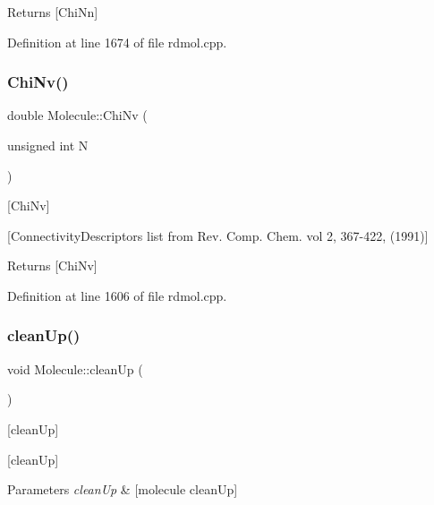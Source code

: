 \begin{DoxyReturn}{Returns}
\mbox{[}Chi\+Nn\mbox{]} 
\end{DoxyReturn}


Definition at line 1674 of file rdmol.\+cpp.

\mbox{\label{class_molecule_ada6fd7f4b47622e5a07d80052cf0d0b5}} 
\subsubsection{\texorpdfstring{Chi\+Nv()}{ChiNv()}}
{\footnotesize\ttfamily double Molecule\+::\+Chi\+Nv (\begin{DoxyParamCaption}\item[{unsigned int}]{N }\end{DoxyParamCaption})}



\mbox{[}Chi\+Nv\mbox{]} 

\mbox{[}Connectivity\+Descriptors list from Rev. Comp. Chem. vol 2, 367-\/422, (1991)\mbox{]}

\begin{DoxyReturn}{Returns}
\mbox{[}Chi\+Nv\mbox{]} 
\end{DoxyReturn}


Definition at line 1606 of file rdmol.\+cpp.

\mbox{\label{class_molecule_ae9aeca03c03bbd36ab63c4a69e2ddc82}} 
\subsubsection{\texorpdfstring{clean\+Up()}{cleanUp()}}
{\footnotesize\ttfamily void Molecule\+::clean\+Up (\begin{DoxyParamCaption}{ }\end{DoxyParamCaption})}



\mbox{[}clean\+Up\mbox{]} 

\mbox{[}clean\+Up\mbox{]}


\begin{DoxyParams}{Parameters}
{\em clean\+Up} & \mbox{[}molecule clean\+Up\mbox{]} \\
\hline
\end{DoxyParams}


